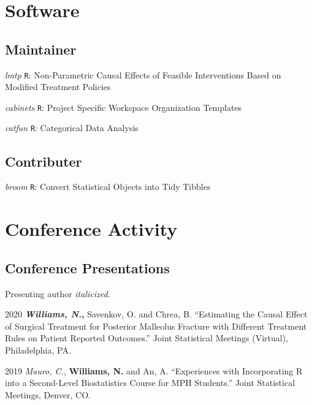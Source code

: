 \documentclass[12pt,letterpaper]{report}
\begin{document}
    \section*{Software}
    
    \subsection*{Maintainer}
    
    \begin{tablist}
    
    	\item[\textit{lmtp}] \tab \texttt{R}: Non-Parametric Causal Effects of Feasible Interventions Based on Modified Treatment Policies
	
	\item[\textit{cabinets}] \tab \texttt{R}: Project Specific Workspace Organization Templates
	
	\item[\textit{catfun}] \tab \texttt{R}: Categorical Data Analysis
    
    \end{tablist}
    
    \subsection*{Contributer}
    
    \begin{tablist}
    
    	\item[\textit{broom}] \tab \texttt{R}: Convert Statistical Objects into Tidy Tibbles
    
    \end{tablist}

    \section*{Conference Activity}

    \subsection*{Conference Presentations}

    Presenting author \textit{italicized}. \bigskip

    \begin{tablist}
    
	\item[2020] \tab \textbf{\textit{Williams, N.},} Savenkov, O. and Chrea, B. \enquote{Estimating the Causal Effect of Surgical Treatment for Posterior Malleolus Fracture with Different Treatment Rules on Patient Reported Outcomes.} Joint Statistical Meetings (Virtual), Philadelphia, PA.
    
    	\item[2019] \tab \textit{Mauro, C.}, \textbf{Williams, N.} and An, A. \enquote{Experiences with Incorporating R into a Second-Level Biostatistics Course for MPH Students.} Joint Statistical Meetings, Denver, CO.

    \end{tablist}
\end{document}
